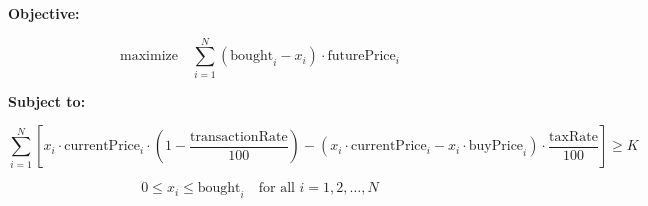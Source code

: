 \documentclass{article}
\begin{document}
\textbf{Objective:}

\[
\text{maximize} \quad \sum_{i=1}^{N} (\text{bought}_i - x_i) \cdot \text{futurePrice}_i
\]

\textbf{Subject to:}

\[
\sum_{i=1}^{N} \left[ x_i \cdot \text{currentPrice}_i \cdot \left(1 - \frac{\text{transactionRate}}{100}\right) - (x_i \cdot \text{currentPrice}_i - x_i \cdot \text{buyPrice}_i) \cdot \frac{\text{taxRate}}{100} \right] \geq K
\]

\[
0 \leq x_i \leq \text{bought}_i \quad \text{for all } i = 1, 2, \ldots, N
\]
\end{document}
